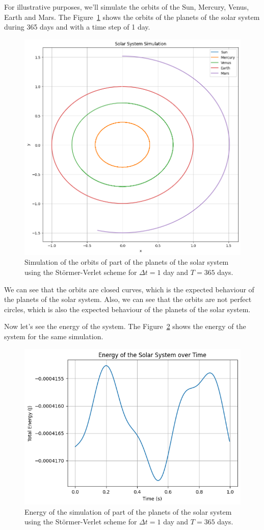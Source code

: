 \documentclass{article}
\begin{document}
For illustrative purposes, we'll simulate the orbits of the Sun, Mercury, Venus, Earth and Mars. The Figure~\ref{fig:solarsystem} shows the orbits of the planets of the solar system during 365 days and with a time step of 1 day.

\begin{figure}[H]
	\centering
	\includegraphics[width=0.5\linewidth]{./Figures/SolarSystem/orbits.png}
	\caption{Simulation of the orbits of part of the planets of the solar system using the Störmer-Verlet scheme for \(\Delta t = 1\) day and \(T = 365\) days.}
	\label{fig:solarsystem}
\end{figure}

We can see that the orbits are closed curves, which is the expected behaviour of the planets of the solar system. Also, we can see that the orbits are not perfect circles, which is also the expected behaviour of the planets of the solar system. 

Now let's see the energy of the system. The Figure~\ref{fig:solarsystemenergy1} shows the energy of the system for the same simulation.

\begin{figure}[H]
	\centering
	\includegraphics[width=0.5\linewidth]{./Figures/SolarSystem/energy1.png}
	\caption{Energy of the simulation of part of the planets of the solar system using the Störmer-Verlet scheme for \(\Delta t = 1\) day and \(T = 365\) days.}
	\label{fig:solarsystemenergy1}
\end{figure}
\end{document}
